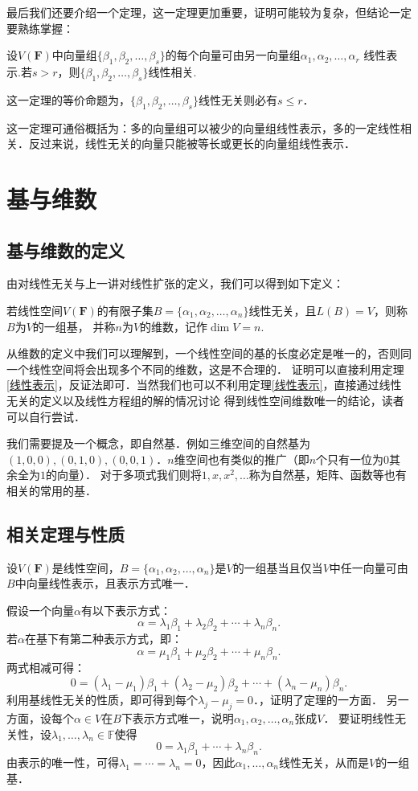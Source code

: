 最后我们还要介绍一个定理，这一定理更加重要，证明可能较为复杂，但结论一定要熟练掌握：
\begin{theorem}\label{线性表示}
	设$V(\mathbf{F})$中向量组$\{\beta_1,\beta_2,\ldots,\beta_s\}$的每个向量可由另一向量组$\alpha_1,\alpha_2,\ldots,\alpha_r$
	线性表示.若$s>r$，则$\{\beta_1,\beta_2,\ldots,\beta_s\}$线性相关.
\end{theorem}
这一定理的等价命题为，$\{\beta_1,\beta_2,\ldots,\beta_s\}$线性无关则必有$s\le r$．

这一定理可通俗概括为：多的向量组可以被少的向量组线性表示，多的一定线性相关．反过来说，线性无关的向量只能被等长或更长的向量组线性表示．

\section{基与维数}
\subsection{基与维数的定义}
由对线性无关与上一讲对线性扩张的定义，我们可以得到如下定义：
\begin{definition}
	若线性空间$V(\mathbf{F})$的有限子集$B=\{\alpha_1,\alpha_2,\ldots,\alpha_n\}$线性无关，且$L(B) = V$，则称$B$为$V$的一组基，
	并称$n$为$V$的维数，记作$\dim V = n$.
\end{definition}

从维数的定义中我们可以理解到，一个线性空间的基的长度必定是唯一的，否则同一个线性空间将会出现多个不同的维数，这是不合理的．
证明可以直接利用定理\ref{线性表示}，反证法即可．当然我们也可以不利用定理\ref{线性表示}，直接通过线性无关的定义以及线性方程组的解的情况讨论
得到线性空间维数唯一的结论，读者可以自行尝试．

我们需要提及一个概念，即自然基．例如三维空间的自然基为$(1,0,0),(0,1,0),(0,0,1)$．$n$维空间也有类似的推广（即$n$个只有一位为$0$其余全为$1$的向量）．
对于多项式我们则将$1,x,x^2,\ldots$称为自然基，矩阵、函数等也有相关的常用的基．

\subsection{相关定理与性质}
\begin{theorem}
	设$V(\mathbf{F})$是线性空间，$B=\{\alpha_1,\alpha_2,\ldots,\alpha_n\}$是$V$的一组基当且仅当$V$中任一向量可由$B$中向量线性表示，且表示方式唯一．
\end{theorem}
假设一个向量$\alpha$有以下表示方式：$$\alpha=\lambda_1\beta_1+\lambda_2\beta_2+\cdots+\lambda_n\beta_n.$$
若$\alpha$在基下有第二种表示方式，即：$$\alpha=\mu_1\beta_1+\mu_2\beta_2+\cdots+\mu_n\beta_n.$$
两式相减可得：$$0=(\lambda_1-\mu_1)\beta_1+(\lambda_2-\mu_2)\beta_2+\cdots+(\lambda_n-\mu_n)\beta_n.$$
利用基线性无关的性质，即可得到每个$\lambda_j-\mu_j=0$．，证明了定理的一方面．
另一方面，设每个$\alpha\in V$在$B$下表示方式唯一，说明$\alpha_1,\alpha_2,\ldots,\alpha_n$张成$V$．
要证明线性无关性，设$\lambda_1,\ldots,\lambda_n\in\mathbb{F}$使得$$0=\lambda_1\beta_1+\cdots+\lambda_n\beta_n.$$
由表示的唯一性，可得$\lambda_1=\cdots=\lambda_n=0$，因此$\alpha_1,\ldots,\alpha_n$线性无关，从而是$V$的一组基．

